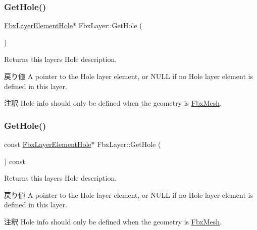 \subsubsection{\texorpdfstring{Get\+Hole()}{GetHole()}\hspace{0.1cm}{\footnotesize\ttfamily [1/2]}}
{\footnotesize\ttfamily \hyperlink{class_fbx_layer_element_hole}{Fbx\+Layer\+Element\+Hole}$\ast$ Fbx\+Layer\+::\+Get\+Hole (\begin{DoxyParamCaption}{ }\end{DoxyParamCaption})}

Returns this layer\textquotesingle{}s Hole description. \begin{DoxyReturn}{戻り値}
A pointer to the Hole layer element, or {\ttfamily N\+U\+LL} if no Hole layer element is defined in this layer. 
\end{DoxyReturn}
\begin{DoxyRemark}{注釈}
Hole info should only be defined when the geometry is \hyperlink{class_fbx_mesh}{Fbx\+Mesh}. 
\end{DoxyRemark}
\mbox{\label{class_fbx_layer_a8cd6dfd6c70d2f7d485f020b366f1c1c}} 
\subsubsection{\texorpdfstring{Get\+Hole()}{GetHole()}\hspace{0.1cm}{\footnotesize\ttfamily [2/2]}}
{\footnotesize\ttfamily const \hyperlink{class_fbx_layer_element_hole}{Fbx\+Layer\+Element\+Hole}$\ast$ Fbx\+Layer\+::\+Get\+Hole (\begin{DoxyParamCaption}{ }\end{DoxyParamCaption}) const}

Returns this layer\textquotesingle{}s Hole description. \begin{DoxyReturn}{戻り値}
A pointer to the Hole layer element, or {\ttfamily N\+U\+LL} if no Hole layer element is defined in this layer. 
\end{DoxyReturn}
\begin{DoxyRemark}{注釈}
Hole info should only be defined when the geometry is \hyperlink{class_fbx_mesh}{Fbx\+Mesh}. 
\end{DoxyRemark}
\mbox{\label{class_fbx_layer_a417bb2646afafaac9cc3e79caa742db3}} 
